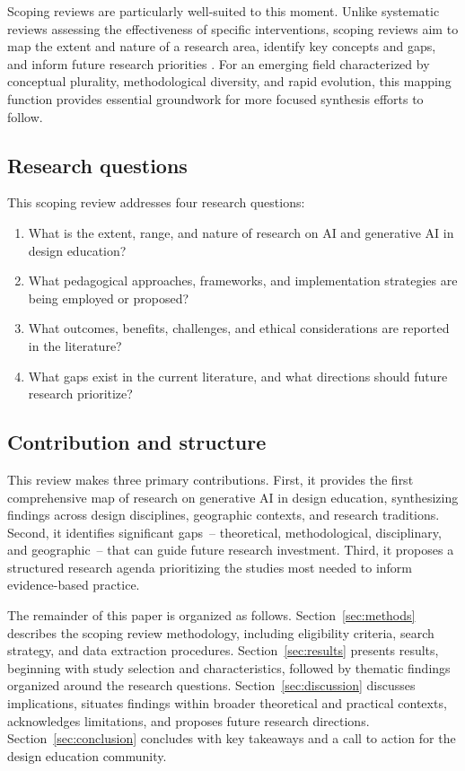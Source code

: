 \documentclass[ed]{acnsart}
\begin{document}
Scoping reviews are particularly well-suited to this moment. Unlike systematic reviews assessing the effectiveness of specific interventions, scoping reviews aim to map the extent and nature of a research area, identify key concepts and gaps, and inform future research priorities \cite{Arksey2005, Tricco2018}. For an emerging field characterized by conceptual plurality, methodological diversity, and rapid evolution, this mapping function provides essential groundwork for more focused synthesis efforts to follow.

\subsection{Research questions}

This scoping review addresses four research questions:

\begin{enumerate}[label=\textbf{RQ\arabic*:}, leftmargin=2cm, itemsep=0.5em]
    \item What is the extent, range, and nature of research on AI and generative AI in design education?
    \item What pedagogical approaches, frameworks, and implementation strategies are being employed or proposed?
    \item What outcomes, benefits, challenges, and ethical considerations are reported in the literature?
    \item What gaps exist in the current literature, and what directions should future research prioritize?
\end{enumerate}

\subsection{Contribution and structure}

This review makes three primary contributions. First, it provides the first comprehensive map of research on generative AI in design education, synthesizing findings across design disciplines, geographic contexts, and research traditions. Second, it identifies significant gaps~-- theoretical, methodological, disciplinary, and geographic~-- that can guide future research investment. Third, it proposes a structured research agenda prioritizing the studies most needed to inform evidence-based practice.

The remainder of this paper is organized as follows. Section~\ref{sec:methods} describes the scoping review methodology, including eligibility criteria, search strategy, and data extraction procedures. Section~\ref{sec:results} presents results, beginning with study selection and characteristics, followed by thematic findings organized around the research questions. Section~\ref{sec:discussion} discusses implications, situates findings within broader theoretical and practical contexts, acknowledges limitations, and proposes future research directions. Section~\ref{sec:conclusion} concludes with key takeaways and a call to action for the design education community.
\end{document}
